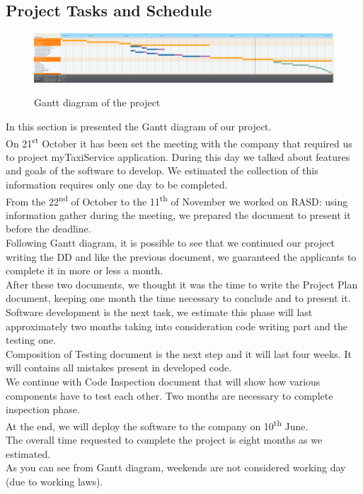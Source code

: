 \newpage
\begin{landscape}
\section{Project Tasks and Schedule}
\begin{figure}[H]
\centering
\includegraphics[scale=0.25]{DiagramSources/Ganttingsoftware2.png}
\label{Figure 1: }\caption{Gantt diagram of the project}
\end{figure}
\end{landscape}
In this section is presented the Gantt diagram of our project.\\
On 21\textsuperscript{st} October it has been set the meeting with the company that required us to project myTaxiService application. During this day we talked about features and goals of the software to develop. We estimated the collection of this information requires only one day to be completed. \\
From the 22\textsuperscript{nd} of October to the 11\textsuperscript{th} of November we worked on RASD: using information gather during the meeting, we prepared the document to present it before the deadline. \\
Following Gantt diagram, it is possible to see that we continued our project writing the DD and like the previous document, we guaranteed the applicants to complete it in more or less a month. \\
After these two documents, we thought it was the time to write the Project Plan document, keeping one month the time necessary to conclude and to present it. \\
Software development is the next task, we estimate this phase will last approximately two months taking into consideration code writing part and the testing one. \\
Composition of Testing document is the next step and it will last four weeks. It will contains all mistakes present in developed code. \\
We continue with Code Inspection document that will show how various components have to test each other. Two months are necessary to complete inspection phase. \\
At the end, we will deploy the software to the company on 10\textsuperscript{th} June. \\
The overall time requested to complete the project is eight months as we estimated. \\
As you can see from Gantt diagram, weekends are not considered working day (due to working laws).\\
       